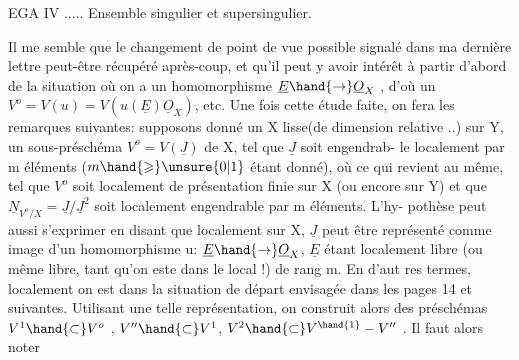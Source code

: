 
EGA IV ..... Ensemble singulier et supersingulier.

Il me semble que le changement de point de vue possible signalé dans ma
dernière lettre peut-être récupéré après-coup, et qu'il peut y avoir intérêt
à partir d'abord de la situation où on a  un homomorphisme $\underline{E}\hand{\to}\underline{O}_X$ , d'où
un $V^o = V(u) = V(u(\underline{E})\underline{O}_X)$, etc. Une fois cette étude faite, on fera les
remarques suivantes: supposons donné un X lisse(de dimension relative  ..)
sur Y, un sous-préschéma $V^o = V(\underline{J})$ de X, tel que $\underline{J}$ soit engendrab-%
le localement  par m éléments ($m\hand{\geqslant}\unsure{0|1}$ étant donné), où ce qui revient au
même, tel que $V^o$ soit localement de présentation finie sur X (ou encore sur
Y) et que  $\underline{N}_{V^o/X} = \underline{J}/\underline{J}^2$  soit localement engendrable par m éléments.  L'hy-%
pothèse peut aussi s'exprimer en disant que localement sur X, $\underline{J}$ peut être
représenté comme image d'un homomorphisme  u: $\underline{E}\hand{\to}\underline{O}_X$, $\underline{E}$ étant localement
libre (ou même libre, tant qu'on este dans le local !) de rang m.  En d'aut
res termes, localement on est dans la situation de départ envisagée dans
les pages 14 et suivantes. Utilisant une telle représentation, on construit
alors des préschémas  $V^1 \hand{\subset} V^o$ , $V'' \hand{\subset} V^1$, $V^2 \hand{\subset} V^{\hand{1}}-V''$ . Il faut alors noter
